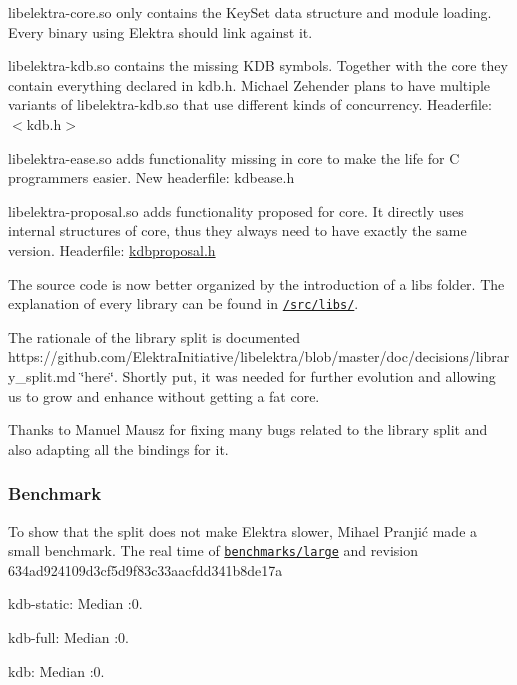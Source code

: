 \begin{DoxyItemize}
\item {\ttfamily libelektra-\/core.\+so} only contains the {\ttfamily Key\+Set} data structure and module loading. Every binary using Elektra should link against it.
\item {\ttfamily libelektra-\/kdb.\+so} contains the missing {\ttfamily K\+D\+B} symbols. Together with the {\ttfamily core} they contain everything declared in {\ttfamily kdb.\+h}. Michael Zehender plans to have multiple variants of {\ttfamily libelektra-\/kdb.\+so} that use different kinds of concurrency. Headerfile\+: {\ttfamily $<$kdb.\+h$>$}
\item {\ttfamily libelektra-\/ease.\+so} adds functionality missing in {\ttfamily core} to make the life for C programmers easier. New headerfile\+: {\ttfamily kdbease.\+h}
\item {\ttfamily libelektra-\/proposal.\+so} adds functionality proposed for {\ttfamily core}. It directly uses internal structures of {\ttfamily core}, thus they always need to have exactly the same version. Headerfile\+: {\ttfamily \hyperlink{kdbproposal_8h}{kdbproposal.\+h}}
\end{DoxyItemize}

The source code is now better organized by the introduction of a {\ttfamily libs} folder. The explanation of every library can be found in \href{https://github.com/ElektraInitiative/libelektra/tree/master/src/libs}{\tt /src/libs/}.

The rationale of the library split is documented https\+://github.com/\+Elektra\+Initiative/libelektra/blob/master/doc/decisions/library\+\_\+split.\+md \char`\"{}here\char`\"{}. Shortly put, it was needed for further evolution and allowing us to grow and enhance without getting a fat core.

Thanks to Manuel Mausz for fixing many bugs related to the library split and also adapting all the bindings for it.

\subsubsection*{Benchmark}

To show that the split does not make Elektra slower, Mihael Pranjić made a small benchmark. The real time of \href{https://github.com/ElektraInitiative/libelektra/blob/master/benchmarks/large.c}{\tt benchmarks/large} and revision 634ad924109d3cf5d9f83c33aacfdd341b8de17a


\begin{DoxyEnumerate}
\item kdb-\/static\+: Median \+:0.
\item kdb-\/full\+: Median \+:0.
\item kdb\+: Median \+:0.
\end{DoxyEnumerate}

